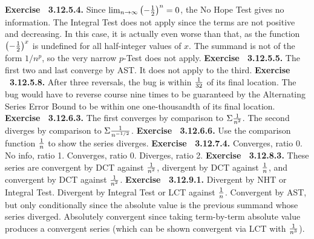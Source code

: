  {\noindent \protect \bf  Exercise ~3.12.5.4.} \textbullet Since $\protect \qopname  \relax m{lim}_{n\to \infty }\left (-\protect \frac  {1}{2}\right )^n=0$, the No Hope Test gives no information. \textbullet The Integral Test does not apply since the terms are not positive and decreasing. In this case, it is actually even worse than that, as the function $\left (-\protect \frac  {1}{2}\right )^x$ is undefined for all half-integer values of $x$. \textbullet The summand is not of the form $1/n^p$, so the very narrow $p$-Test does not apply. \protect \newline  \protect \newline  
 {\noindent \protect \bf  Exercise ~3.12.5.5.} The first two and last converge by AST. It does not apply to the third. \protect \newline  \protect \newline  
 {\noindent \protect \bf  Exercise ~3.12.5.8.} After three reversals, the bug is within $\protect \frac  {1}{32}$ of its final location. The bug would have to reverse course nine times to be guaranteed by the Alternating Series Error Bound to be within one one-thousandth of its final location.  \protect \newline  \protect \newline  
 {\noindent \protect \bf  Exercise ~3.12.6.3.} The first converges by comparison to $\Sigma \protect \frac  {1}{n^2}$. The second diverges by comparison to $\Sigma \protect \frac  {1}{n^{-1/2}}$. \protect \newline  \protect \newline  
 {\noindent \protect \bf  Exercise ~3.12.6.6.} Use the comparison function $\protect \frac  {1}{n}$ to show the series diverges. \protect \newline  \protect \newline  
 {\noindent \protect \bf  Exercise ~3.12.7.4.} \textbullet Converges, ratio 0. \textbullet No info, ratio 1. \textbullet Converges, ratio 0. \textbullet Diverges, ratio 2. \protect \newline  \protect \newline  
 {\noindent \protect \bf  Exercise ~3.12.8.3.} These series are convergent by DCT against $\protect \frac  {1}{n^2}$, divergent by DCT against $\protect \frac  {1}{n}$, and convergent by DCT against $\protect \frac  {1}{n^2}$. \protect \newline  \protect \newline  
 {\noindent \protect \bf  Exercise ~3.12.9.1.} \textbullet Divergent by NHT or Integral Test. \textbullet Divergent by Integral Test or LCT against $\protect \frac  {1}{n}$. \textbullet Convergent by AST, but only conditionally since the absolute value is the previous summand whose series diverged. \textbullet Absolutely convergent since taking term-by-term absolute value produces a convergent series (which can be shown convergent via LCT with $\protect \frac  {1}{n^3}$). \protect \newline  \protect \newline  
